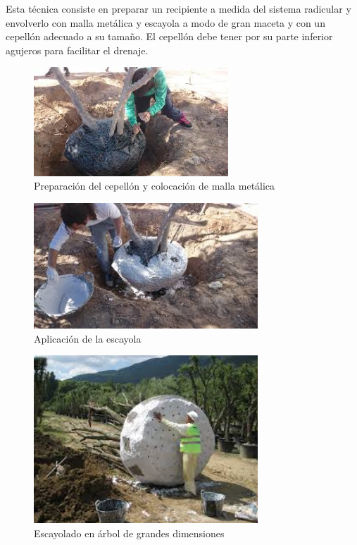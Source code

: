 \documentclass[a4paper,12pt,oneside]{article}
\begin{document}
\begin{enumerate}
\begin{enumerate}
Esta técnica consiste en preparar un recipiente a medida del sistema radicular y
envolverlo con malla metálica y escayola a modo de gran maceta y con un cepellón
adecuado a su tamaño. El cepellón debe tener por su parte inferior agujeros para
facilitar el drenaje. 
\begin{figure}[htbp]
\centering
\includegraphics[width=0.65\textwidth]{./img_uf1596/escayolado_1.jpg}
\caption{Preparación del cepellón y colocación de malla metálica}
\end{figure}
\begin{figure}[htbp]
\centering
\includegraphics[width=0.75\textwidth]{./img_uf1596/escayolado_2.jpg}
\caption{Aplicación de la escayola}
\end{figure}
\begin{figure}[htbp]
\centering
\includegraphics[width=0.75\textwidth]{./img_uf1596/escayolado_3.jpg}
\caption{Escayolado en árbol de grandes dimensiones}
\end{figure}


\end{enumerate}
\end{enumerate}
\end{document}
